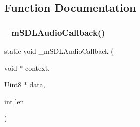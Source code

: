 \subsection{Function Documentation}
\mbox{\label{sdl-audio_8c_a1ab36538916d6aebaea28162cb4e35a4}} 
\subsubsection{\texorpdfstring{\+\_\+m\+S\+D\+L\+Audio\+Callback()}{\_mSDLAudioCallback()}}
{\footnotesize\ttfamily static void \+\_\+m\+S\+D\+L\+Audio\+Callback (\begin{DoxyParamCaption}\item[{void $\ast$}]{context,  }\item[{Uint8 $\ast$}]{data,  }\item[{\mbox{\hyperlink{ioapi_8h_a787fa3cf048117ba7123753c1e74fcd6}{int}}}]{len }\end{DoxyParamCaption})\hspace{0.3cm}{\ttfamily [static]}}

